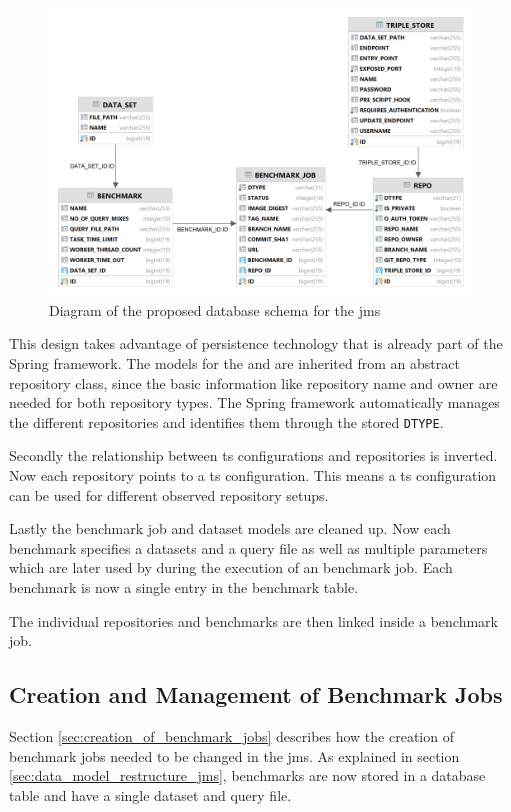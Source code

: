 \begin{figure}[tbph]
	\centering
	\includegraphics[width=.75\textwidth]{figures/jms_db_schema_design.png}
	\caption{Diagram of the proposed database schema for the \ac{jms}}
	\label{fig:design_jms_db_schema}
\end{figure}

This design takes advantage of persistence technology that is already part of the Spring framework.
The models for the \gh{} and \dockh{} are inherited from an abstract repository class, since the basic information like repository name and owner are needed for both repository types.
The Spring framework automatically manages the different repositories and identifies them through the stored \texttt{DTYPE}.

Secondly the relationship between \ac{ts} configurations and repositories is inverted. 
Now each repository points to a \ac{ts} configuration.
This means a \ac{ts} configuration can be used for different observed repository setups.

Lastly the benchmark job and dataset models are cleaned up.
Now each benchmark specifies a datasets and a query file as well as multiple parameters which are later used by \iguana{} during the execution of an benchmark job.
Each benchmark is now a single entry in the benchmark table.

The individual repositories and benchmarks are then linked inside a benchmark job.


\subsection{Creation and Management of Benchmark Jobs}
\label{sec:creation_of_benchmark_jobs_design}
Section \ref{sec:creation_of_benchmark_jobs} describes how the creation of benchmark jobs needed to be changed in the \ac{jms}.
As explained in section \ref{sec:data_model_restructure_jms}, benchmarks are now stored in a database table and have a single dataset and query file.


